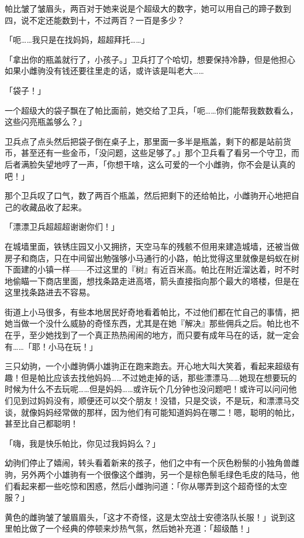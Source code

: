 帕比皱了皱眉头，两百对于她来说是个超级大的数字，她可以用自己的蹄子数到四，说不定还能数到十，不过两百？一百是多少？

「呃……我只是在找妈妈，超超拜托……」

「拿出你的瓶盖就行了，小孩子。」卫兵打了个哈切，想要保持冷静，但是他担心如果小雌驹没有钱还要往里走的话，或许该是叫老大……{}

「袋子！」

一个超级大的袋子飘在了帕比面前，她交给了卫兵，「呃……你们能帮我数数看么，这些闪亮瓶盖够么？」

卫兵点了点头然后把袋子倒在桌子上，那里面一多半是瓶盖，剩下的都是站前货币，甚至还有一些金币，「没问题，这些足够了。」那个卫兵看了看另一个守卫，而后者满脸失望地哼了一声，「你想干啥，这么可爱的一个小雌驹，你不会是认真的吧！」

那个卫兵叹了口气，数了两百个瓶盖，然后把剩下的还给帕比，小雌驹开心地把自己的收藏品收了起来。

「漂漂卫兵超超超谢谢你们！」

在城墙里面，铁锈庄园又小又拥挤，天空马车的残骸不但用来建造城墙，还被当做房子和商店，只在中间留出勉强够小马通行的小路，帕比觉得这里就像是蚂蚁在树下面建的小镇一样——不过这里的『树』有近百米高。帕比在附近溜达着，时不时地偷瞄一下商店里面，想找条路走进高塔，箭头直接指向那个最大的塔楼，但是在这里找条路进去不容易。

街道上小马很多，有些本地居民好奇地看着帕比，不过他们都在忙自己的事情，把她当做一个没什么威胁的奇怪东西，尤其是在她『解决』那些佣兵之后。帕比也不在乎，至少她找到了一个真正热热闹闹的地方，而只要有成年马在的话，就一定会有……「耶！小马在玩！」

三只幼驹，一个小雌驹俩小雄驹正在跑来跑去。开心地大叫大笑着，看起来超级有趣！但是帕比应该去找他妈妈……不过她走掉的话，那些漂漂马……她现在想要玩的时候为什么不去玩呢……但是妈妈……或许玩个几分钟也没问题吧！或许可以问问他们见到过妈妈没有，顺便还可以交个朋友！没错，只是交谈，不是玩，和漂漂马交谈，就像妈妈经常做的那样，因为他们有可能知道妈妈在哪二！嗯，聪明的帕比，甚至比自己都聪明！

「嗨，我是快乐帕比，你见过我妈妈么？」

幼驹们停止了嬉闹，转头看着新来的孩子，他们之中有一个灰色粉鬃的小独角兽雌驹，另外两个小雄驹有一个很像这个雌驹，另一个是棕色鬃毛绿色毛皮的陆马，他们看起来都一些吃惊和困惑，然后小雌驹问道：「你从哪弄到这个超奇怪的太空服？」

黄色的雌驹皱了皱眉眉头，「这才不奇怪，这是太空战士安德洛队长服！」说到这里帕比做了一个经典的停顿来炒热气氛，然后她补充道：「超级酷！」


